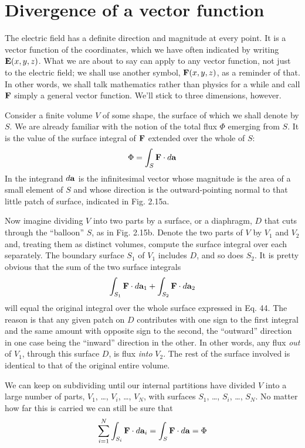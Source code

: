 \section{Divergence of a vector function}

The electric field has a definite direction and magnitude at every
point. It is a vector function of the coordinates, which we have often
indicated by writing $\mathbf{E}(x,y,z)$. What we are about to say can apply
to any vector function, not just to the electric field; we shall use
another symbol, $\mathbf{F}(x,y,z)$, as a reminder of that. In other words, we
shall talk mathematics rather than physics for a while and call $\mathbf{F}$
simply a general vector function. We'll stick to three dimensions,
however.

Consider a finite volume $V$ of some shape, the surface of which we
shall denote by $S$. We are already familiar with the notion of the total
flux $\Phi$ emerging from $S$. It is the value of the surface integral of $\mathbf{F}$
extended over the whole of $S$:
\begin{equation}
  \Phi = \int_S \mathbf{F}\cdot d\mathbf{a}
\end{equation}
In the integrand $d\mathbf{a}$ is the infinitesimal vector whose magnitude is the
area of a small element of $S$ and whose direction is the outward-pointing
normal to that little patch of surface, indicated in Fig. 2.15a.

Now imagine dividing $V$ into two parts by a surface, or a diaphragm,
$D$ that cuts through the ``balloon'' $S$, as in Fig. 2.15b.
Denote the two parts of $V$ by $V_1$ and $V_2$ and, treating them as distinct
volumes, compute the surface integral over each separately. The
boundary surface $S_1$ of $V_1$ includes $D$, and so does $S_2$. It is pretty
obvious that the sum of the two surface integrals
\begin{equation}
  \int_{S_1} \mathbf{F}\cdot d \mathbf{a}_1 + \int_{S_2} \mathbf{F}\cdot d \mathbf{a}_2
\end{equation}
will equal the original integral over the whole surface expressed in
Eq. 44. The reason is that any given patch on $D$ contributes with
one sign to the first integral and the same amount with opposite sign
to the second, the ``outward'' direction in one case being the ``inward''
direction in the other. In other words, any flux \emph{out} of $V_1$, through
this surface $D$, is flux \emph{into} $V_2$. The rest of the surface involved is
identical to that of the original entire volume.

We can keep on subdividing until our internal partitions have
divided $V$ into a large number of parts, $V_1$, \ldots, $V_i$, \ldots , $V_N$, with surfaces
$S_1$, \ldots, $S_i$, \ldots , $S_N$. No matter how far this is carried we can
still be sure that
\begin{equation}
  \sum_{i=1}^N \int_{S_i} \mathbf{F}\cdot d \mathbf{a}_i = \int_S \mathbf{F}\cdot d \mathbf{a} = \Phi
\end{equation}

